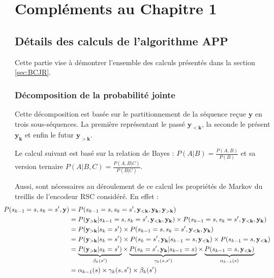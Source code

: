 
\appendix

\chapter{Compléments au Chapitre 1}

\section{Détails des calculs de l'algorithme APP}\label{append:app}
Cette partie vise à démontrer l'ensemble des calculs présentés dans la section \ref{sec:BCJR}.
\subsection{Décomposition de la probabilité jointe} 
Cette décomposition est basée sur le partitionnement de la séquence reçue $\mathbf{y}$ en trois sous-séquences. La première représentant le passé $ \mathbf{y_{<k}}$, la seconde le présent $\mathbf{y_{k}} $ et enfin le futur $ \mathbf{y_{>k}}$.

Le calcul suivant est basé sur la relation de Bayes : $P(A|B) = \frac{P(A,B)}{P(B)}$ et sa version ternaire $P(A|B,C) = \frac{P(A,B|C)}{P(B|C)}$.

Aussi, sont nécessaires au déroulement de ce calcul les propriétés de Markov du treillis de l'encodeur RSC considéré. En effet :
\begin{align*}
	\hspace*{-4ex}
	P(s_{k-1}=s, s_{k}=s',\mathbf{y}) & = P(s_{k-1}=s, s_{k}=s',\mathbf{y_{<k}},\mathbf{y_{k}},\mathbf{y_{>k}})                                                                                                                             \\
	                                  & = P(\mathbf{y_{>k}}|s_{k-1}=s, s_{k}=s',\mathbf{y_{<k}},\mathbf{y_{k}})\times P(s_{k-1}=s, s_{k}=s',\mathbf{y_{<k}},\mathbf{y_{k}})                                                                 \\
	                                  & =P(\mathbf{y_{>k}}|s_{k}=s')\times P(s_{k-1}=s, s_{k}=s',\mathbf{y_{<k}},\mathbf{y_{k}})                                                                                                            \\
	                                  & =P(\mathbf{y_{>k}}|s_{k}=s')\times P(s_{k}=s',\mathbf{y_{k}}|s_{k-1}=s,\mathbf{y_{<k}})\times P(s_{k-1}=s,\mathbf{y_{<k}})                                                                          \\
	                                  & = \underbrace{P(\mathbf{y_{>k}}|s_{k}=s')}_{\beta_k(s')}\times \underbrace{P(s_{k}=s',\mathbf{y_{k}}|s_{k-1}=s)}_{\gamma_k(s,s')}\times \underbrace{P(s_{k-1}=s,\mathbf{y_{<k}})}_{\alpha_{k-1}(s)} \\
	                                  & = \alpha_{k-1}(s) \times \gamma_k(s,s') \times \beta_k(s')                                                                                                                                          
\end{align*}

